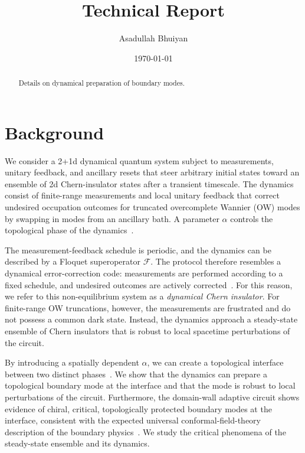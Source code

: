 \documentclass[aps,prb,twocolumn,superscriptaddress,longbibliography,floatfix]{revtex4-2}
\theoremstyle{plain}
\theoremstyle{definition}
\theoremstyle{remark}
\begin{document}
\title{Technical Report}
\author{Asadullah Bhuiyan}
\noaffiliation
\date{\today}

\begin{abstract}
  Details on dynamical preparation of boundary modes.
\end{abstract}

\maketitle

\setcounter{tocdepth}{2}
\tableofcontents

\section{Background}

We consider a 2+1d dynamical quantum system subject to measurements, unitary feedback, and ancillary resets that steer arbitrary initial states toward an ensemble of 2d Chern-insulator states after a transient timescale. The dynamics consist of finite-range measurements and local unitary feedback that correct undesired occupation outcomes for truncated overcomplete Wannier (OW) modes by swapping in modes from an ancillary bath. A parameter $\alpha$ controls the topological phase of the dynamics~\cite{BhuiyanPanJian2026}.

The measurement-feedback schedule is periodic, and the dynamics can be described by a Floquet superoperator $\mathcal F$. The protocol therefore resembles a dynamical error-correction code: measurements are performed according to a fixed schedule, and undesired outcomes are actively corrected~\cite{HastingsHaah2021,AasenHaahLiMong2023}. For this reason, we refer to this non-equilibrium system as a \emph{dynamical Chern insulator}. For finite-range OW truncations, however, the measurements are frustrated and do not possess a common dark state. Instead, the dynamics approach a steady-state ensemble of Chern insulators that is robust to local spacetime perturbations of the circuit.

By introducing a spatially dependent $\alpha$, we can create a topological interface between two distinct phases~\cite{Hatsugai1993,HasanKane2010,QiZhang2011}. We show that the dynamics can prepare a topological boundary mode at the interface and that the mode is robust to local perturbations of the circuit. Furthermore, the domain-wall adaptive circuit shows evidence of chiral, critical, topologically protected boundary modes at the interface, consistent with the expected universal conformal-field-theory description of the boundary physics~\cite{CalabreseCardy2004}. We study the critical phenomena of the steady-state ensemble and its dynamics.
\end{document}
